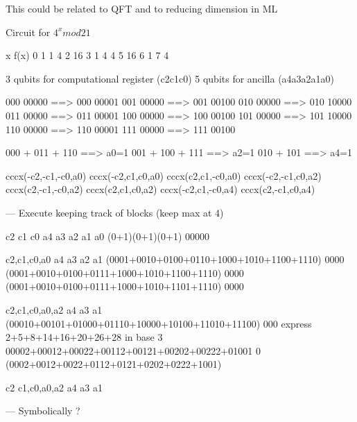 \documentclass{article}
\newcommand{\red}[1]{{\color{red}{#1}}}
\newcommand{\todo}[1]{\fbox{\begin{minipage}{40em}{\red{#1}}\end{minipage}}}
\begin{document}
\begin{refsection}
{This could be related to QFT and to reducing dimension in ML

Circuit for $4^x mod 21$

x    f(x)
0    1
1    4
2    16
3    1
4    4
5    16
6    1
7    4

3 qubits for computational register (c2c1c0)
5 qubits for ancilla (a4a3a2a1a0)

000 00000  ==> 000 00001
001 00000  ==> 001 00100
010 00000  ==> 010 10000
011 00000  ==> 011 00001
100 00000  ==> 100 00100
101 00000  ==> 101 10000
110 00000  ==> 110 00001
111 00000  ==> 111 00100

000 + 011 + 110 ==> a0=1
001 + 100 + 111 ==> a2=1
010 + 101       ==> a4=1

cccx(-c2,-c1,-c0,a0)
cccx(-c2,c1,c0,a0)
cccx(c2,c1,-c0,a0)
cccx(-c2,-c1,c0,a2)
cccx(c2,-c1,-c0,a2)
cccx(c2,c1,c0,a2)
cccx(-c2,c1,-c0,a4)
cccx(c2,-c1,c0,a4)

--- Execute keeping track of blocks (keep max at 4)

{c2} {c1} {c0} {a4} {a3} {a2} {a1} {a0}
     (0+1)(0+1)(0+1) 00000

{c2,c1,c0,a0} {a4} {a3} {a2} {a1}
 (0001+0010+0100+0110+1000+1010+1100+1110) 0000
 (0001+0010+0100+0111+1000+1010+1100+1110) 0000
 (0001+0010+0100+0111+1000+1010+1101+1110) 0000

{c2,c1,c0,a0,a2} {a4} {a3} {a1}
 (00010+00101+01000+01110+10000+10100+11010+11100) 000
 express 2+5+8+14+16+20+26+28 in base 3
 00002+00012+00022+00112+00121+00202+00222+01001
 0 (0002+0012+0022+0112+0121+0202+0222+1001)

{c2} {c1,c0,a0,a2} {a4} {a3} {a1}


--- Symbolically ?

}

\todo{
start with base 2 (booleans) and maximum groups of p.
if groups get too big switch to another basis that makes the representation smaller
related to p-adics ???
}

\todo{ longest clause gives period; basically we have constraints on
  all the vars in the longest clause; $2^i$ where i is the index of
  the next variable is the period

Try: 1285, 196611, 327685
}

\todo{
do communication protocols too ?

extensional vs intensional reasoning about functions

graph state: H,H,CZ
00   00
01   01
10   10
11 -11

check if H commutes with x and cx and ccx
so we only need H at beginning and end

}
\end{refsection}
\end{document}

